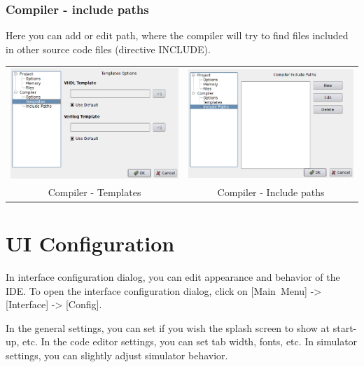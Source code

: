         \subsubsection{Compiler - include paths}
            Here you can add or edit path, where the compiler will try to find files included in other source code files
            (directive INCLUDE).

            \begin{table}[h!]
                \begin{tabular}{cc}
                    \includegraphics[width=.5\textwidth]{img/config5.png}
                        &
                    \includegraphics[width=.5\textwidth]{img/config6.png}
                        \\
                    Compiler - Templates & Compiler - Include paths
                \end{tabular}
                \end{table}

\clearpage
\section{UI Configuration}
    In interface configuration dialog, you can edit appearance and behavior of the IDE. To open the interface configuration dialog, click on [Main~Menu] -> [Interface] -> [Config].

    In the general settings, you can set if you wish the splash screen to show at start-up, etc. In the code editor settings, you can set tab width, fonts, etc. In simulator settings, you can slightly adjust simulator behavior.


